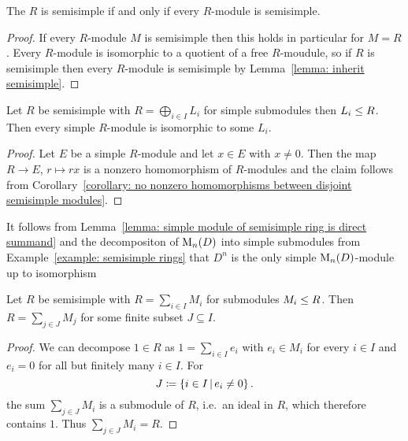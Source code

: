 \begin{proposition}
  The $R$ is semisimple if and only if every $R$-module is semisimple.
\end{proposition}


\begin{proof}
  If every $R$-module $M$ is semisimple then this holds in particular for $M = R$.
  Every $R$-module is isomorphic to a quotient of a free $R$-moudule, so if $R$ is semisimple then every $R$-module is semisimple by Lemma~\ref{lemma: inherit semisimple}.
\end{proof}


\begin{lemma}
  \label{lemma: simple module of semisimple ring is direct summand}
  Let $R$ be semisimple with $R = \bigoplus_{i \in I} L_i$ for simple submodules then $L_i \leq R$.
  Then every simple $R$-module is isomorphic to some $L_i$.
\end{lemma}




\begin{proof}
  Let $E$ be a simple $R$-module and let $x \in E$ with $x \neq 0$.
  Then the map $R \to E$, $r \mapsto rx$ is a nonzero homomorphism of $R$-modules and the claim follows from Corollary~\ref{corollary: no nonzero homomorphisms between disjoint semisimple modules}.
\end{proof}


\begin{example}
  \label{example: D^n is the only simple M_n(D)-module}
  It follows from Lemma~\ref{lemma: simple module of semisimple ring is direct summand} and the decompositon of $\operatorname{M}_n(D)$ into simple submodules from Example~\ref{example: semisimple rings} that $D^n$ is the only simple $\operatorname{M}_n(D)$-module up to isomorphism
\end{example}


\begin{lemma}
  \label{lemma: ring is already finite sum of submodules}
  Let $R$ be semisimple with $R = \sum_{i \in I} M_i$ for submodules $M_i \leq R$.
  Then $R = \sum_{j \in J} M_j$ for some finite subset $J \subseteq I$.
\end{lemma}


\begin{proof}
  We can decompose $1 \in R$ as $1 = \sum_{i \in I} e_i$ with $e_i \in M_i$ for every $i \in I$ and $e_i = 0$ for all but finitely many $i \in I$.
  For
  \[
              J
    \defined  \{ i \in I \suchthat e_i \neq 0 \} \,.
  \]
  the sum $\sum_{j \in J} M_i$ is a submodule of $R$, i.e.\ an ideal in $R$, which therefore contains $1$.
  Thus $\sum_{j \in J} M_i = R$.
\end{proof}


